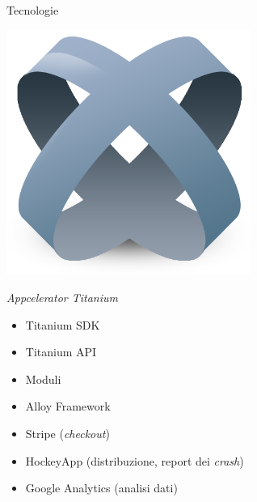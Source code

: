 	\subsection{}
		\begin{frame}{Tecnologie}
			\begin{minipage}{\textwidth}
				\begin{minipage}{0.49\textwidth}
					\includegraphics[width=0.6\textwidth]{capitolo_2/immagini/titanium.png}
				\end{minipage}
				\begin{minipage}{0.49\textwidth}
					\begin{block}{\emph{Appcelerator Titanium}}
						\begin{itemize}
							\item Titanium SDK
							\item Titanium API
							\item Moduli
							\item Alloy Framework
						\end{itemize}
					\end{block}
				\end{minipage}\par
			\end{minipage}\par
			\vspace{3mm}
			\begin{minipage}{\textwidth}
				\begin{minipage}{0.74\textwidth}
					\begin{itemize}
						\item Stripe (\emph{checkout})
						\item HockeyApp (distribuzione, report dei \emph{crash})
						\item Google Analytics (analisi dati)

\end{itemize}
\end{minipage}
\end{minipage}
\end{frame}
